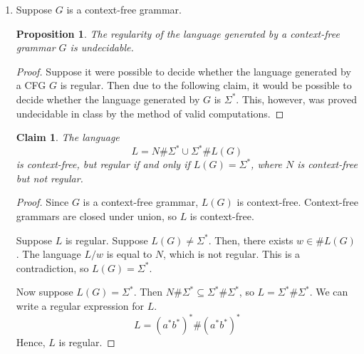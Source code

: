 \documentclass[letterpaper,11pt]{article}
\newtheorem{proposition}{Proposition}
\newtheorem{claim}{Claim}
\begin{document}
\begin{enumerate}
\begin{enumerate}
\begin{proof}
                    Since we can build a DFA for $L/w$ for any choice of $L$
                    and $w$ using operations under which regularity is closed,
                    $L/w$ is regular.
                \end{proof}

            \item
                Suppose $G$ is a context-free grammar.

                \begin{proposition}
                    The regularity of the language generated by a context-free
                    grammar $G$ is undecidable.
                \end{proposition}

                \begin{proof}
                    Suppose it were possible to decide whether the language
                    generated by a CFG $G$ is regular. Then due to the
                    following claim, it would be possible to decide whether the
                    language generated by $G$ is $\Sigma^*$. This, however, was
                    proved undecidable in class by the method of valid
                    computations.
                \end{proof}

                \begin{claim}
                    The language
                    $$L = N\#\Sigma^* \cup \Sigma^*\# L(G)$$
                    is context-free, but regular if and only if
                    $L(G) = \Sigma^*$, where $N$ is context-free but not
                    regular.
                \end{claim}

                \begin{proof}
                    Since $G$ is a context-free grammar, $L(G)$ is
                    context-free.
                    Context-free grammars are closed under union, so $L$ is
                    context-free.

                    Suppose $L$ is regular. Suppose $L(G) \neq \Sigma^*$. Then,
                    there exists $w \in \#L(G)$. The language $L/w$ is equal to
                    $N$, which is not regular. This is a contradiction, so
                    $L(G) = \Sigma^*$.

                    Now suppose $L(G) = \Sigma^*$. Then $N\#\Sigma^*
                    \subseteq \Sigma^*\#\Sigma^*$, so
                    $L = \Sigma^*\#\Sigma^*$.
                    We can write a regular expression for $L$.
                    $$L = (a^* b^*)^* \# (a^* b^*)^*$$
                    Hence, $L$ is regular.
                \end{proof}
        \end{enumerate}


\end{enumerate}
\end{document}
